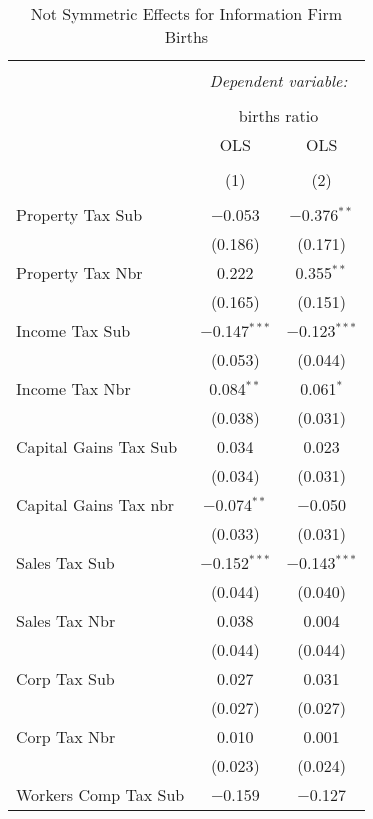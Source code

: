 
\begin{table}[!htbp] \centering 
  \caption{Not Symmetric Effects for  Information Firm Births} 
  \label{51noequality} 
\footnotesize 
\begin{tabular}{@{\extracolsep{5pt}}lcc} 
\\[-1.8ex]\hline 
\hline \\[-1.8ex] 
 & \multicolumn{2}{c}{\textit{Dependent variable:}} \\ 
\cline{2-3} 
\\[-1.8ex] & \multicolumn{2}{c}{births ratio} \\ 
 & OLS & OLS \\ 
\\[-1.8ex] & (1) & (2)\\ 
\hline \\[-1.8ex] 
 Property Tax Sub & $-$0.053 & $-$0.376$^{**}$ \\ 
  & (0.186) & (0.171) \\ 
  Property Tax Nbr & 0.222 & 0.355$^{**}$ \\ 
  & (0.165) & (0.151) \\ 
  Income Tax Sub & $-$0.147$^{***}$ & $-$0.123$^{***}$ \\ 
  & (0.053) & (0.044) \\ 
  Income Tax Nbr & 0.084$^{**}$ & 0.061$^{*}$ \\ 
  & (0.038) & (0.031) \\ 
  Capital Gains Tax Sub & 0.034 & 0.023 \\ 
  & (0.034) & (0.031) \\ 
  Capital Gains Tax nbr & $-$0.074$^{**}$ & $-$0.050 \\ 
  & (0.033) & (0.031) \\ 
  Sales Tax Sub & $-$0.152$^{***}$ & $-$0.143$^{***}$ \\ 
  & (0.044) & (0.040) \\ 
  Sales Tax Nbr & 0.038 & 0.004 \\ 
  & (0.044) & (0.044) \\ 
  Corp Tax Sub & 0.027 & 0.031 \\ 
  & (0.027) & (0.027) \\ 
  Corp Tax Nbr & 0.010 & 0.001 \\ 
  & (0.023) & (0.024) \\ 
  Workers Comp Tax Sub & $-$0.159 & $-$0.127 \\ 

\end{tabular}
\end{table}
